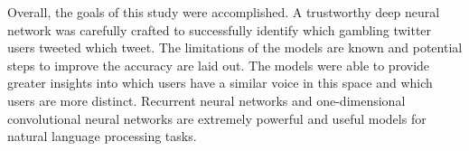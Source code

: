 \documentclass[5p,authoryear]{elsarticle}
\begin{document}
Overall, the goals of this study were accomplished. A trustworthy deep neural network was carefully crafted to successfully identify which gambling twitter users tweeted which tweet. The limitations of the models are known and potential steps to improve the accuracy are laid out. The models were able to provide greater insights into which users have a similar voice in this space and which users are more distinct. Recurrent neural networks and one-dimensional convolutional neural networks are extremely powerful and useful models for natural language processing tasks.





\end{document}
